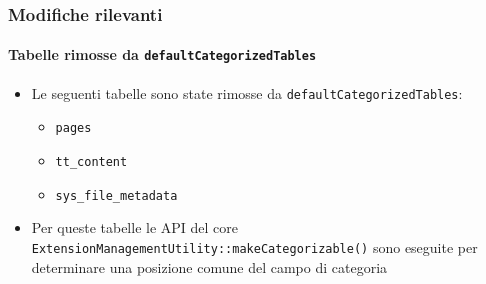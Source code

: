 \begin{frame}[fragile]
	\frametitle{Modifiche rilevanti}
	\framesubtitle{Tabelle rimosse da \texttt{defaultCategorizedTables}}

	\begin{itemize}
		\item Le seguenti tabelle sono state rimosse da \texttt{defaultCategorizedTables}:

			\begin{itemize}
				\item \texttt{pages}
				\item \texttt{tt\_content}
				\item \texttt{sys\_file\_metadata}
			\end{itemize}

		\item Per queste tabelle le API del core\newline
			\texttt{ExtensionManagementUtility::makeCategorizable()}\newline
			sono eseguite per determinare una posizione comune del campo di categoria

	\end{itemize}

\end{frame}


